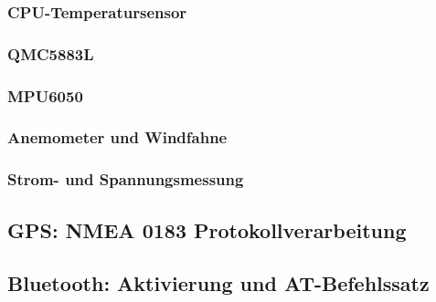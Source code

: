         \subsubsection{CPU-Temperatursensor}

        \subsubsection{QMC5883L}\label{ssec:QMC5883L}
        
        \subsubsection{MPU6050}\label{ssec:MPU6050}
        
        \subsubsection{Anemometer und Windfahne}\label{ssec:Wind}
            
        \subsubsection{Strom- und Spannungsmessung}
       
    \subsection{GPS: NMEA 0183 Protokollverarbeitung}\label{ssec:GPS}
        
    \subsection{Bluetooth: Aktivierung und AT-Befehlssatz}\label{ssec:AT_Commands}
    
 